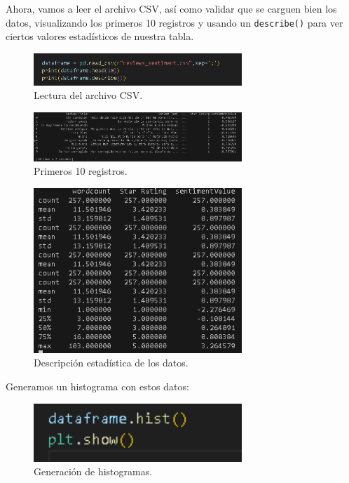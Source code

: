 \documentclass{article}
\begin{document}
Ahora, vamos a leer el archivo CSV, así como validar que se carguen bien los datos, visualizando los primeros 10 registros y usando un \texttt{describe()} para ver ciertos valores estadísticos de nuestra tabla.

\begin{figure}[H]
    \centering
    \includegraphics[width=0.7\textwidth]{img/2.png}
    \caption{Lectura del archivo CSV.}
\end{figure}

\begin{figure}[H]
    \centering
    \includegraphics[width=0.7\textwidth]{img/3.png}
    \caption{Primeros 10 registros.}
\end{figure}

\begin{figure}[H]
    \centering
    \includegraphics[width=0.7\textwidth]{img/4.png}
    \caption{Descripción estadística de los datos.}
\end{figure}

Generamos un histograma con estos datos:

\begin{figure}[H]
    \centering
    \includegraphics[width=0.7\textwidth]{img/5.png}
    \caption{Generación de histogramas.}
\end{figure}
\end{document}

